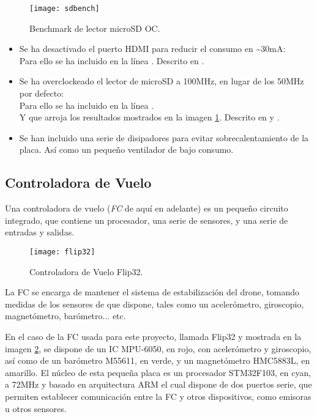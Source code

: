 \begin{figure}
	\centering
	\texttt{[image: sdbench]}
	\caption{Benchmark de lector microSD OC.}\label{fig:sdbenchmark}
\end{figure}

\begin{itemize}
\item Se ha desactivado el puerto HDMI para reducir el consumo en \textasciitilde{}30mA: \\Para ello se ha incluido en  la línea . Descrito en \citep{wiki:PowerSaving}.
\item Se ha overclockeado el lector de microSD a 100MHz, en lugar de los 50MHz por defecto: \\Para ello se ha incluido en  la línea .\\Y que arroja los resultados mostrados en la imagen \ref{fig:sdbenchmark}. Descrito en \citep{wiki:OCSD} y \citep{wiki:OCSDWifiFix}.
\item Se han incluido una serie de disipadores para evitar sobrecalentamiento de la placa. Así como un pequeño ventilador de bajo consumo.
\end{itemize} 


\subsection{Controladora de Vuelo}

Una controladora de vuelo (\textit{FC} de aquí en adelante) es un pequeño circuito integrado, que contiene un procesador, una serie de sensores, y una serie de entradas y salidas. 
\begin{figure}
\centering
\texttt{[image: flip32]}
\caption{Controladora de Vuelo Flip32.}\label{fig:fc}
\end{figure}
La FC se encarga de mantener el sistema de estabilización del drone, tomando medidas de los sensores de que dispone, tales como un acelerómetro, giroscopio, magnetómetro, barómetro... etc. 

En el caso de la FC usada para este proyecto, llamada Flip32 y mostrada en la imagen \ref{fig:fc}, se dispone de un IC MPU-6050, en rojo, con acelerómetro y giroscopio, así como de un barómetro M55611, en verde, y un magnetómetro HMC5883L, en amarillo.
El núcleo de esta pequeña placa es un procesador STM32F103, en cyan, a 72MHz y basado en arquitectura ARM el cual dispone de dos puertos serie, que permiten establecer comunicación entre la FC y otros dispositivos, como emisoras u otros sensores.

